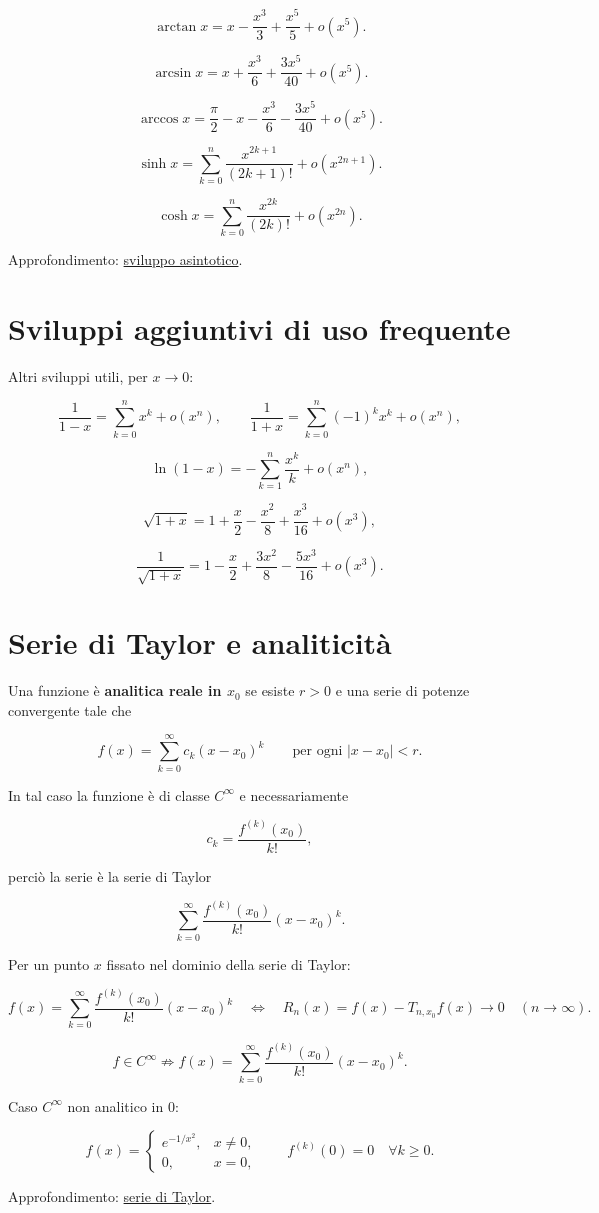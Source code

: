 \[
\displaystyle
\arctan x=x-\frac{x^3}{3}+\frac{x^5}{5}+o(x^5).
\]

\[
\displaystyle
\arcsin x=x+\frac{x^3}{6}+\frac{3x^5}{40}+o(x^5).
\]

\[
\displaystyle
\arccos x
=\frac\pi2-x-\frac{x^3}{6}-\frac{3x^5}{40}+o(x^5).
\]

\[
\displaystyle
\sinh x
=
\sum_{k=0}^{n}\frac{x^{2k+1}}{(2k+1)!}
+o(x^{2n+1}).
\]

\[
\displaystyle
\cosh x
=
\sum_{k=0}^{n}\frac{x^{2k}}{(2k)!}
+o(x^{2n}).
\]

Approfondimento: \href{https://ingegnerismo.it/matematica/sviluppo-asintotico/}{sviluppo asintotico}.

\section{Sviluppi aggiuntivi di uso frequente}\label{sviluppi-aggiuntivi-di-uso-frequente}

Altri sviluppi utili, per \(x\to0\):

\[
\frac1{1-x}=\sum_{k=0}^{n}x^k+o(x^n),
\qquad
\frac1{1+x}=\sum_{k=0}^{n}(-1)^kx^k+o(x^n),
\]

\[
\ln(1-x)=-\sum_{k=1}^{n}\frac{x^k}{k}+o(x^n),
\]

\[
\sqrt{1+x}
=1+\frac x2-\frac{x^2}{8}+\frac{x^3}{16}+o(x^3),
\]

\[
\frac1{\sqrt{1+x}}
=1-\frac x2+\frac{3x^2}{8}-\frac{5x^3}{16}+o(x^3).
\]

\section{Serie di Taylor e analiticità}\label{serie-di-taylor-e-analiticituxe0}

Una funzione è \textbf{analitica reale in \(x_0\)} se esiste \(r>0\) e una serie di potenze convergente tale che

\[
f(x)=\sum_{k=0}^{\infty}c_k(x-x_0)^k
\qquad\text{per ogni }|x-x_0|<r.
\]

In tal caso la funzione è di classe \(C^\infty\) e necessariamente

\[
c_k=\frac{f^{(k)}(x_0)}{k!},
\]

perciò la serie è la serie di Taylor

\[
\displaystyle
\sum_{k=0}^{\infty}
\frac{f^{(k)}(x_0)}{k!}(x-x_0)^k.
\]

Per un punto \(x\) fissato nel dominio della serie di Taylor:

\[
\displaystyle
f(x)=\sum_{k=0}^{\infty}
\frac{f^{(k)}(x_0)}{k!}(x-x_0)^k
\quad\Longleftrightarrow\quad
R_n(x)=f(x)-T_{n,x_0}f(x)\to0
\quad(n\to\infty).
\]

\[
f\in C^\infty
\not\Longrightarrow
f(x)=\sum_{k=0}^{\infty}\frac{f^{(k)}(x_0)}{k!}(x-x_0)^k.
\]

Caso \(C^\infty\) non analitico in \(0\):

\[
\displaystyle
f(x)=
\begin{cases}
e^{-1/x^2}, & x\ne0,\\
0, & x=0,
\end{cases}
\qquad
f^{(k)}(0)=0\quad\forall k\ge0.
\]

Approfondimento: \href{https://ingegnerismo.it/matematica/serie-di-taylor/}{serie di Taylor}.
